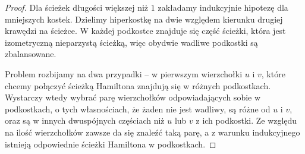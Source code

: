 \documentclass{pracamgr}
\begin{document}
    \begin{proof}
     Dla ścieżek długości większej niż $1$ zakładamy indukcyjnie hipotezę dla mniejszych kostek.
     Dzielimy hiperkostkę na dwie względem kierunku drugiej krawędzi na ścieżce. W każdej podkostce znajduje się część ścieżki,
     która jest izometryczną nieparzystą ścieżką, więc obydwie wadliwe podkostki są zbalansowane.
     
     Problem rozbijamy na dwa przypadki -- w pierwszym wierzchołki $u$ i $v$, które chcemy połączyć ścieżką Hamiltona znajdują się w różnych podkostkach.
     Wystarczy wtedy wybrać parę wierzchołków odpowiadających sobie w podkostkach, o tych własnościach, że żaden nie jest wadliwy, są różne od $u$ i $v$, oraz
     są w innych dwuspójnych częściach niż $u$ lub $v$ z ich podkostki. Ze względu na ilość wierzchołków zawsze da się znaleźć taką parę,
     a z warunku indukcyjnego istnieją odpowiednie ścieżki Hamiltona w podkostkach.
     

\end{proof}
\end{document}
